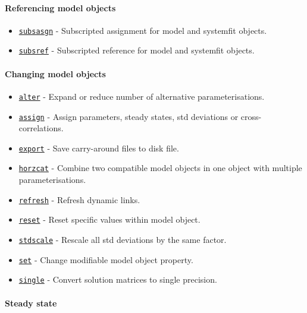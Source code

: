 \paragraph{Referencing model objects}

\begin{itemize}
\itemsep1pt\parskip0pt
\item
  \href{model/subsasgn}{\texttt{subsasgn}} - Subscripted assignment for
  model and systemfit objects.
\item
  \href{model/subsref}{\texttt{subsref}} - Subscripted reference for
  model and systemfit objects.
\end{itemize}

\paragraph{Changing model objects}

\begin{itemize}
\itemsep1pt\parskip0pt
\item
  \href{model/alter}{\texttt{alter}} - Expand or reduce number of
  alternative parameterisations.
\item
  \href{model/assign}{\texttt{assign}} - Assign parameters, steady
  states, std deviations or cross-correlations.
\item
  \href{model/export}{\texttt{export}} - Save carry-around files to disk
  file.
\item
  \href{model/horzcat}{\texttt{horzcat}} - Combine two compatible model
  objects in one object with multiple parameterisations.
\item
  \href{model/refresh}{\texttt{refresh}} - Refresh dynamic links.
\item
  \href{model/reset}{\texttt{reset}} - Reset specific values within
  model object.
\item
  \href{model/stdscale}{\texttt{stdscale}} - Rescale all std deviations
  by the same factor.
\item
  \href{model/set}{\texttt{set}} - Change modifiable model object
  property.
\item
  \href{model/single}{\texttt{single}} - Convert solution matrices to
  single precision.
\end{itemize}

\paragraph{Steady state}

